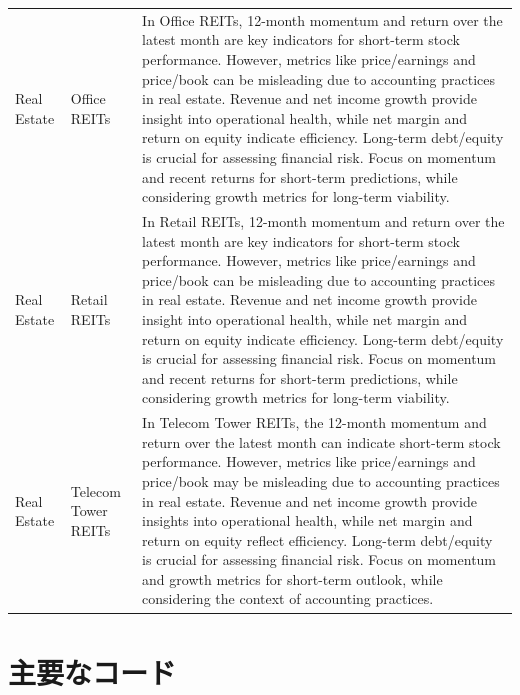 \documentclass[xelatex,ja=standard,jafont=hiragino-pron,a4paper,10pt]{bxjsreport}
\begin{document}
{\begin{longtable}{p{1.90cm}p{2.90cm}p{9.60cm}}
Real Estate & Office REITs & In Office REITs, 12-month momentum and return over the latest month are key indicators for short-term stock performance. However, metrics like price/earnings and price/book can be misleading due to accounting practices in real estate. Revenue and net income growth provide insight into operational health, while net margin and return on equity indicate efficiency. Long-term debt/equity is crucial for assessing financial risk. Focus on momentum and recent returns for short-term predictions, while considering growth metrics for long-term viability. \\
Real Estate & Retail REITs & In Retail REITs, 12-month momentum and return over the latest month are key indicators for short-term stock performance. However, metrics like price/earnings and price/book can be misleading due to accounting practices in real estate. Revenue and net income growth provide insight into operational health, while net margin and return on equity indicate efficiency. Long-term debt/equity is crucial for assessing financial risk. Focus on momentum and recent returns for short-term predictions, while considering growth metrics for long-term viability. \\
Real Estate & Telecom Tower REITs & In Telecom Tower REITs, the 12-month momentum and return over the latest month can indicate short-term stock performance. However, metrics like price/earnings and price/book may be misleading due to accounting practices in real estate. Revenue and net income growth provide insights into operational health, while net margin and return on equity reflect efficiency. Long-term debt/equity is crucial for assessing financial risk. Focus on momentum and growth metrics for short-term outlook, while considering the context of accounting practices. \\
\end{longtable}
}

\chapter{主要なコード}\label{app:code}
\end{document}
